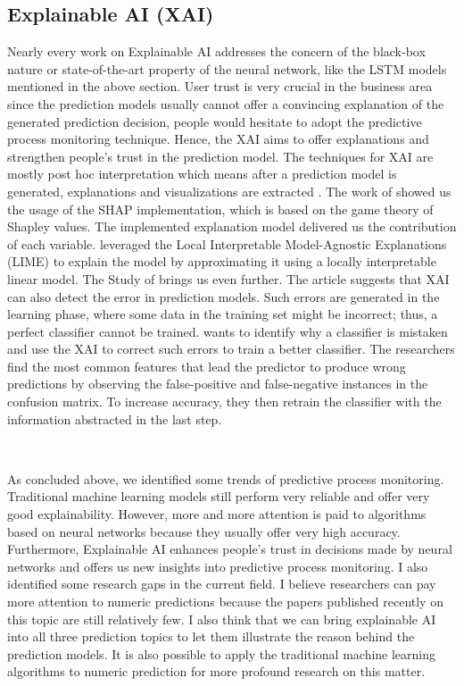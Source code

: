\documentclass[runningheads]{llncs}
\begin{document}
		\subsection{Explainable AI (XAI)}
		Nearly every work on Explainable AI addresses the concern of the black-box nature or state-of-the-art property of the neural network, like the LSTM models mentioned in the above section. User trust is very crucial in the business area \cite{art-17} since the prediction models usually cannot offer a convincing explanation of the generated prediction decision, people would hesitate to adopt the predictive process monitoring technique. Hence, the XAI aims to offer explanations and strengthen people's trust in the prediction model. The techniques for XAI are mostly post hoc interpretation which means after a prediction model is generated, explanations and visualizations are extracted \cite{art-20}. The work of \cite{art-17} showed us the usage of the SHAP implementation, which is based on the game theory of Shapley values. The implemented explanation model delivered us the contribution of each variable. \cite{art-20} leveraged the Local Interpretable Model-Agnostic Explanations (LIME) to explain the model by approximating it using a locally interpretable linear model. The Study of \cite{art-11} brings us even further. The article \cite{art-11} suggests that XAI can also detect the error in prediction models. Such errors are generated in the learning phase, where some data in the training set might be incorrect; thus, a perfect classifier cannot be trained. \cite{art-11} wants to identify why a classifier is mistaken and use the XAI to correct such errors to train a better classifier. The researchers find the most common features that lead the predictor to produce wrong predictions by observing the false-positive and false-negative instances in the confusion matrix. To increase accuracy, they then retrain the classifier with the information abstracted in the last step.        
				
		\
		
		As concluded above, we identified some trends of predictive process monitoring. Traditional machine learning models still perform very reliable and offer very good explainability. However, more and more attention is paid to algorithms based on neural networks because they usually offer very high accuracy. Furthermore, Explainable AI enhances people's trust in decisions made by neural networks and offers us new insights into predictive process monitoring. I also identified some research gaps in the current field. I believe researchers can pay more attention to numeric predictions because the papers published recently on this topic are still relatively few. I also think that we can bring explainable AI into all three prediction topics to let them illustrate the reason behind the prediction models. It is also possible to apply the traditional machine learning algorithms to numeric prediction for more profound research on this matter.   
		
\end{document}
